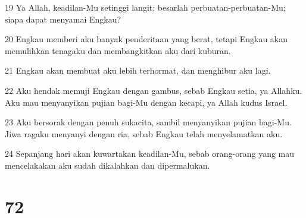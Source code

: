 \par 19 Ya Allah, keadilan-Mu setinggi langit; besarlah perbuatan-perbuatan-Mu; siapa dapat menyamai Engkau?
\par 20 Engkau memberi aku banyak penderitaan yang berat, tetapi Engkau akan memulihkan tenagaku dan membangkitkan aku dari kuburan.
\par 21 Engkau akan membuat aku lebih terhormat, dan menghibur aku lagi.
\par 22 Aku hendak memuji Engkau dengan gambus, sebab Engkau setia, ya Allahku. Aku mau menyanyikan pujian bagi-Mu dengan kecapi, ya Allah kudus Israel.
\par 23 Aku bersorak dengan penuh sukacita, sambil menyanyikan pujian bagi-Mu. Jiwa ragaku menyanyi dengan ria, sebab Engkau telah menyelamatkan aku.
\par 24 Sepanjang hari akan kuwartakan keadilan-Mu, sebab orang-orang yang mau mencelakakan aku sudah dikalahkan dan dipermalukan.

\chapter{72}

